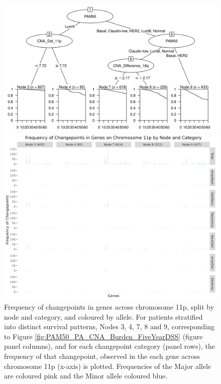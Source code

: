 \begin{figure}[!htp]
\centering

\includegraphics[width=1\textwidth]{../figures/Chapter_3/PA_PartyKit_Survival_Burden_FiveYearDSS_PAM50.png}

\vspace{0.5cm}

\includegraphics[width = 1\textwidth]{../figures/Chapter_6/Chromosome_11p_Barplot_Node.png}
\caption[Frequency of changepoints in genes across chromosome 11p, split by node and category, and coloured by allele.]{Frequency of changepoints in genes across chromosome 11p, split by node and category, and coloured by allele. For patients stratified into distinct survival patterns, Nodes 3, 4, 7, 8 and 9, corresponding to Figure \ref{fig:PAM50_PA_CNA_Burden_FiveYearDSS} (figure panel columns), and for each changepoint category (panel rows), the frequency of that changepoint, observed in the each gene across chromosome 11p (x-axis) is plotted. Frequencies of the Major allele are coloured pink and the Minor allele coloured blue.}
\label{fig:Barplot_11p}
\end{figure}

